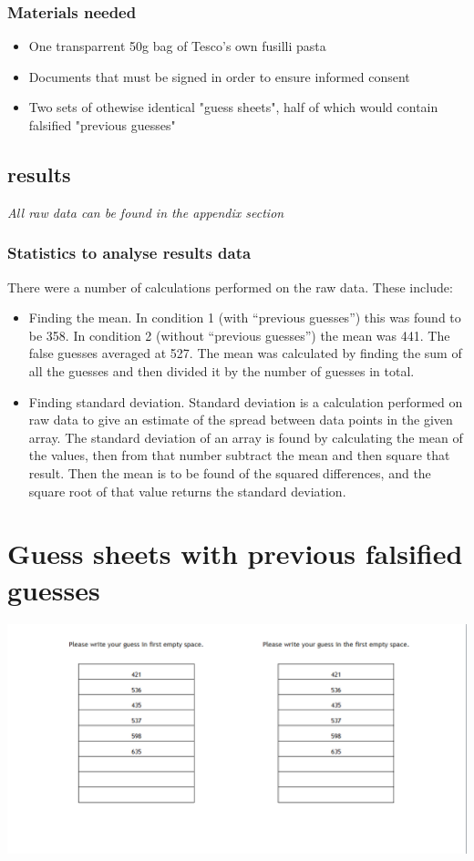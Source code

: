 \documentclass{report}
\begin{document}
\subsection{Materials needed}
\begin{itemize}
  \item One transparrent 50g bag of Tesco's own fusilli pasta
  \item Documents that must be signed in order to ensure informed consent
  \item Two sets of othewise identical "guess sheets", half of which would contain falsified "previous guesses"
\end{itemize}
\section{results}
\textit{All raw data can be found in the appendix section}
\subsection{Statistics to analyse results data}
There were a number of calculations performed on the raw data. These include:
\begin{itemize}
\item Finding the mean. In condition 1 (with “previous guesses”) this was found to be 358. In condition 2 (without “previous guesses”) the mean was 441. The false guesses averaged at 527. The mean was calculated by finding the sum of all the guesses and then divided it by the number of guesses in total.
\item Finding standard deviation. Standard deviation is a calculation performed on raw data to give an estimate of the spread between data points in the given array. The standard deviation of an array is found by calculating the mean of the values, then from that number subtract the mean and then square that result. Then the mean is to be found of the squared differences, and the square root of that value returns the standard deviation.
\end{itemize}
\appendix
\appendixpage
\addappheadtotoc
\chapter{Guess sheets with previous falsified guesses}
\includegraphics[width=\textwidth]{psych1}
\end{document}
